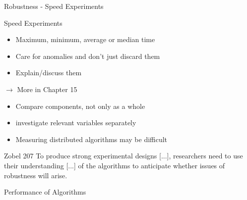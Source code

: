 \documentclass{beamer}
\begin{document}
\begin{frame}{Robustness - Speed Experiments}
\begin{block}{Speed Experiments}
\begin{itemize}
\item Maximum, minimum, average or median time 
\item Care for anomalies and don't just discard them
\item Explain/discuss them
\end{itemize}
$\rightarrow$ More in Chapter 15
\end{block}

\end{frame}

\begin{frame}
\begin{itemize}
\item Compare components, not only as a whole
\item investigate relevant variables separately
\item Measuring distributed algorithms may be difficult 
\end{itemize}
\begin{block}{Zobel 207}
To produce strong experimental designs [...], researchers need to use their understanding [...] of the algorithms to
anticipate whether issues of robustness will arise.
\end{block}

\end{frame}

\begin{frame}{Performance of Algorithms}

\end{frame}
\end{document}
